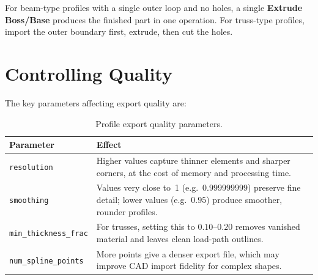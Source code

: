 \begin{notebox}[Tip]
For beam-type profiles with a single outer loop and no holes, a single
\textbf{Extrude Boss/Base} produces the finished part in one operation.
For truss-type profiles, import the outer boundary first, extrude, then
cut the holes.
\end{notebox}

\section{Controlling Quality}
\label{sec:export:quality}

The key parameters affecting export quality are:

\begin{table}[H]
\centering
\caption{Profile export quality parameters.}
\begin{tabularx}{\textwidth}{lX}
\toprule
\textbf{Parameter} & \textbf{Effect} \\
\midrule
\texttt{resolution}           & Higher values capture thinner elements and
                                sharper corners, at the cost of memory and
                                processing time. \\
\texttt{smoothing}            & Values very close to~1 (e.g.\ $0.999999999$)
                                preserve fine detail; lower values
                                (e.g.\ $0.95$) produce smoother, rounder
                                profiles. \\
\texttt{min\_thickness\_frac} & For trusses, setting this to $0.10$--$0.20$
                                removes vanished material and leaves clean
                                load-path outlines. \\
\texttt{num\_spline\_points}  & More points give a denser export file,
                                which may improve CAD import fidelity for
                                complex shapes. \\
\bottomrule
\end{tabularx}
\end{table}